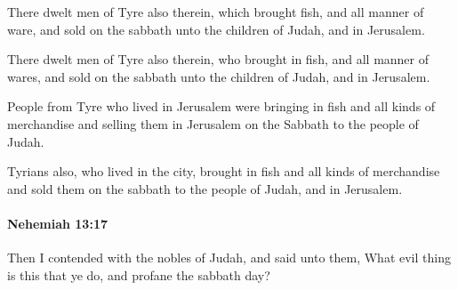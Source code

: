 			There dwelt men of Tyre also therein, which brought fish, and all manner of ware, and sold on the sabbath unto the children of Judah, and in Jerusalem.

			\begin{versebox}
					\item[BHS] 
					\item[LXX] 
					\item[ASV] There dwelt men of Tyre also therein, who brought in fish, and all manner of wares, and sold on the sabbath unto the children of Judah, and in Jerusalem.
					\item[NIV] People from Tyre who lived in Jerusalem were bringing in fish and all kinds of merchandise and selling them in Jerusalem on the Sabbath to the people of Judah.
					\item[NRSV] Tyrians also, who lived in the city, brought in fish and all kinds of merchandise and sold them on the sabbath to the people of Judah, and in Jerusalem.
			\end{versebox}

		\paragraph{Nehemiah 13:17} %
			\label{NEHEMIAH-13-17}

			Then I contended with the nobles of Judah, and said unto them, What evil thing is this that ye do, and profane the sabbath day?

